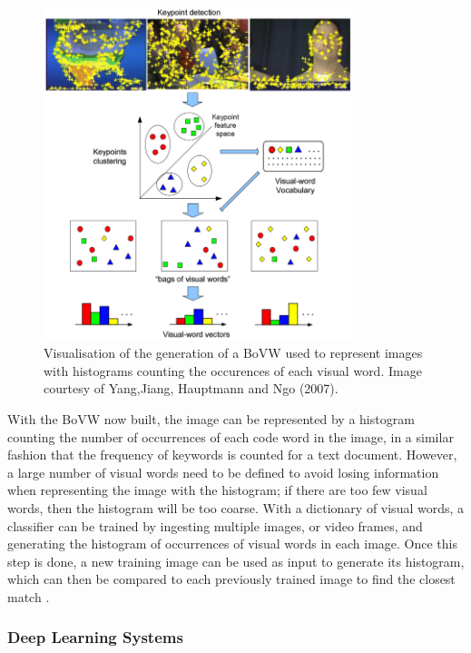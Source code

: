 \begin{figure}[h] 
\centerline{\includegraphics[width=0.8\textwidth]{figures/litsurvey/bovw.png}}
\caption{\label{fig:litsurvey-bovw}Visualisation of the generation of a BoVW used to represent images with histograms counting the occurences of each visual word. Image courtesy of Yang,Jiang, Hauptmann and Ngo (2007).}
\end{figure}

With the BoVW now built, the image can be represented by a histogram counting the number of occurrences of each code word in the image, in a similar fashion that the frequency of keywords is counted for a text document. However, a large number of visual words need to be defined to avoid losing information when representing the image with the histogram; if there are too few visual words, then the histogram will be too coarse. With a dictionary of visual words, a classifier can be trained by ingesting multiple images, or video frames, and generating the histogram of occurrences of visual words in each image. Once this step is done, a new training image can be used as input to generate its histogram, which can then be compared to each previously trained image to find the closest match \cite{wang2016actionregonition}.

\subsubsection{Deep Learning Systems}


